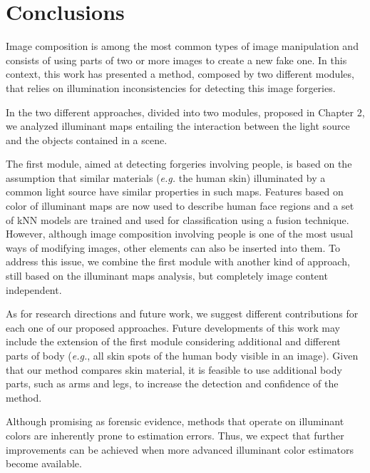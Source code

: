 \chapter*{Conclusions}

Image composition is among the most common types of image manipulation and consists of using parts of two or more images to create a new fake one. In this context, this work has presented a method, composed by two different modules, that relies on illumination inconsistencies for detecting this image forgeries.

In the two different approaches, divided into two modules, proposed in Chapter 2, we analyzed illuminant maps entailing the interaction between the light source and the objects contained in a scene. 

The first module, aimed at detecting forgeries involving people, is based on the assumption that similar materials (\emph{e.g.} the human skin) illuminated by a common light source have similar properties in such maps. Features based on color of illuminant maps are now used to describe human face regions and a set of kNN models are trained and used for classification using a fusion technique. However, although image composition involving people is one of the most usual ways of modifying images, other elements can also be inserted into them. To address this issue, we combine the first module with another kind of approach, still based on the illuminant maps analysis, but completely image content independent.

As for research directions and future work, we suggest different contributions for each one of our proposed approaches. Future developments of this work may include the extension of the first module considering additional and different parts of body (\emph{e.g.}, all skin spots of the human body visible in an image). Given that our method compares skin material, it is feasible to use additional body parts, such as arms and legs, to increase the detection and confidence of the method.

Although promising as forensic evidence, methods that operate on illuminant colors are inherently prone to estimation errors. Thus, we expect that further improvements can be achieved when more advanced illuminant color estimators become available.